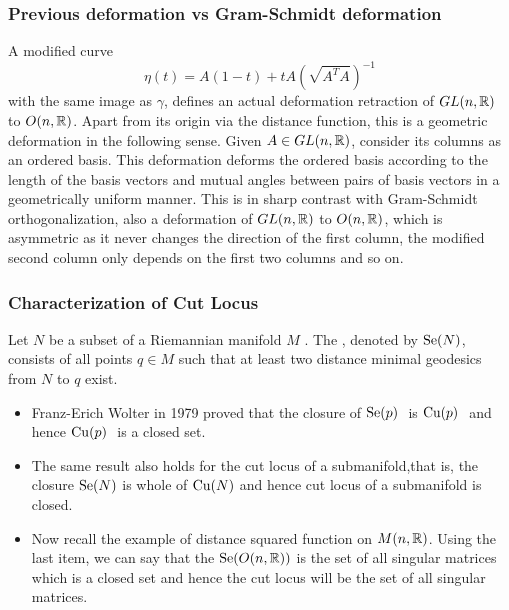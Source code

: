 \documentclass{beamer}
\begin{document}
	\begin{frame}
		\frametitle<presentation>{Previous deformation vs Gram-Schmidt deformation}
		\p A modified curve
		\begin{displaymath}
			\eta(t)=A(1-t)+tA \left(\sqrt{A^TA}\right)^{-1}
		\end{displaymath}
		\p with the same image as $\gamma$, defines an actual deformation retraction of $GL(n,\mathbb{R})$ to $O(n,\mathbb{R})$. \p Apart from its origin via the distance function, this is a geometric deformation in the following sense. \p Given $A\in GL(n,\mathbb{R})$, consider its columns as an ordered basis. \p This deformation deforms the ordered basis according to the length of the basis vectors and mutual angles between pairs of basis vectors in a geometrically uniform manner. \p This is in sharp contrast with Gram-Schmidt orthogonalization, also a deformation of $GL(n,\mathbb{R})$ to $O(n,\mathbb{R})$, which is asymmetric as it never changes the direction of the first column, the modified second column only depends on the first two columns and so on.
	\end{frame}	

	\begin{frame}
		\frametitle<presentation>{Characterization of Cut Locus}
		\p 
		\begin{definition}
			Let $N$ be a subset of a Riemannian manifold $M$ . The \emph{}, denoted by $\mathrm{Se}(N)$, \p  consists of all points $q\in M$ such that at least two distance minimal geodesics from $N$ to $q$ exist.
		\end{definition}

		\begin{itemize}
			\p \item Franz-Erich Wolter in 1979 proved that the closure of $\mathrm{Se}(p)~$ is $\mathrm{Cu}(p)~$ \p and hence $\mathrm{Cu}(p)~$ is a closed set.

			\p \item The same result also holds for the cut locus of a submanifold,\p  that is, the closure $\mathrm{Se}(N)$ is whole of $\mathrm{Cu}(N)$ and hence cut locus of a submanifold is closed.

			\p \item Now recall the example of distance squared function on $M(n,\mathbb{R})$. \p Using the last item, we can say that the $\mathrm{Se}(O(n,\mathbb{R}))$ is the set of all singular matrices which is a closed set \p and hence the cut locus will be the set of all singular matrices.
		\end{itemize}
	\end{frame}	
\end{document}
